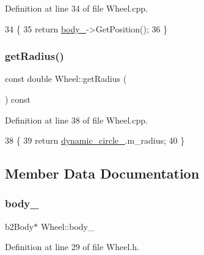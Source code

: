 Definition at line 34 of file Wheel.\+cpp.


\begin{DoxyCode}
34                                        \{
35     \textcolor{keywordflow}{return} \hyperlink{classWheel_a155ed4c915b672ca1dd3a6fdd51ff6e9}{body\_}->GetPosition();
36 \}
\end{DoxyCode}
\mbox{\label{classWheel_a224ac73d325efb3cdc389a36d54ca10b}} 
\subsubsection{\texorpdfstring{get\+Radius()}{getRadius()}}
{\footnotesize\ttfamily const double Wheel\+::get\+Radius (\begin{DoxyParamCaption}{ }\end{DoxyParamCaption}) const}



Definition at line 38 of file Wheel.\+cpp.


\begin{DoxyCode}
38                                     \{
39     \textcolor{keywordflow}{return} \hyperlink{classWheel_a9464768a2f778d0da93bd53e8beb7740}{dynamic\_circle\_}.m\_radius;
40 \}
\end{DoxyCode}


\subsection{Member Data Documentation}
\mbox{\label{classWheel_a155ed4c915b672ca1dd3a6fdd51ff6e9}} 
\subsubsection{\texorpdfstring{body\+\_\+}{body\_}}
{\footnotesize\ttfamily b2\+Body$\ast$ Wheel\+::body\+\_\+\hspace{0.3cm}{\ttfamily [private]}}



Definition at line 29 of file Wheel.\+h.

\mbox{\label{classWheel_a3ab427a9baabb06def9994e54c6adea4}} 
